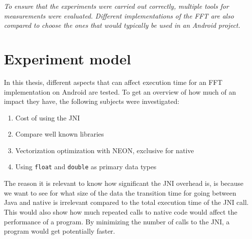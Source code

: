 \textit{To ensure that the experiments were carried out correctly, multiple tools for measurements were evaluated. Different implementations of the FFT are also compared to choose the ones that would typically be used in an Android project.}

\section{Experiment model}


In this thesis, different aspects that can affect execution time for an FFT implementation on Android are tested. To get an overview of how much of an impact they have, the following subjects were investigated:

\begin{enumerate}
    \item Cost of using the JNI
    \item Compare well known libraries
    \item Vectorization optimization with NEON, exclusive for native
    \item Using \texttt{float} and \texttt{double} as primary data types
\end{enumerate}

The reason it is relevant to know how significant the JNI overhead is, is because we want to see for what size of the data the transition time for going between Java and native is irrelevant compared to the total execution time of the JNI call. This would also show how much repeated calls to native code would affect the performance of a program. By minimizing the number of calls to the JNI, a program would get potentially faster.


